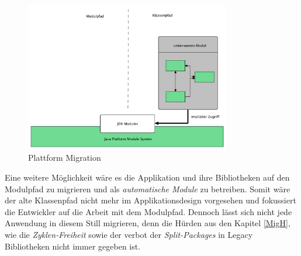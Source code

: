 	\begin{figure}[h]
		\centering
	    \includegraphics[width=0.8\textwidth]{material/images/platform-migrate.pdf}
	    \caption{Plattform Migration \cite{modulMitJava9}}
	    \label{fig:PM}
  	\end{figure}

	Eine weitere Möglichkeit wäre es die Applikation und ihre Bibliotheken auf den Modulpfad zu migrieren und als \textit{automatische Module} zu betreiben. Somit wäre der alte Klassenpfad  nicht mehr im Applikationsdesign vorgesehen und fokussiert die Entwickler auf die Arbeit mit dem Modulpfad. Dennoch lässt sich nicht jede Anwendung in diesem Still migrieren, denn die Hürden aus den Kapitel \ref{MigH}, wie die \textit{Zyklen-Freiheit} sowie der verbot der \textit{Split-Packages} in Legacy Bibliotheken nicht immer gegeben ist. 



